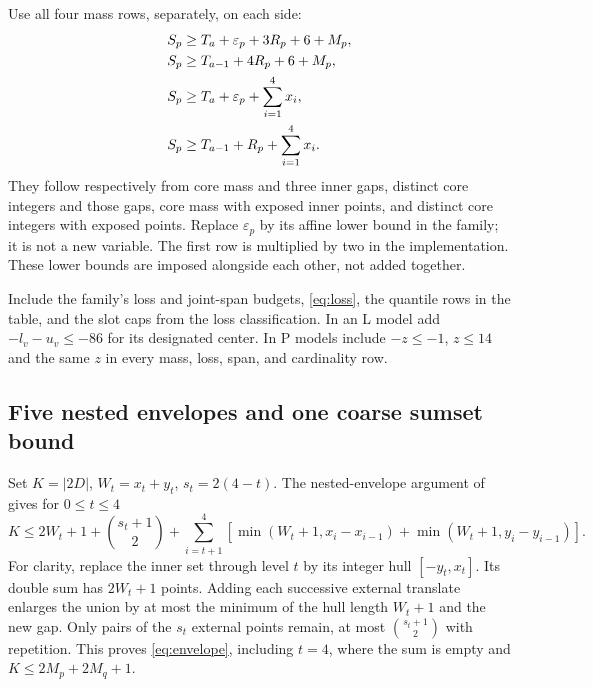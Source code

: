 \documentclass[11pt,a4paper]{article}
\begin{document}
Use all four mass rows, separately, on each side:
\begin{align}
 S_p&\ge T_a+\varepsilon_p+3R_p+6+M_p,\notag\\
 S_p&\ge T_{a-1}+4R_p+6+M_p,\notag\\
 S_p&\ge T_a+\varepsilon_p+\sum_{i=1}^4x_i,\notag\\
 S_p&\ge T_{a-1}+R_p+\sum_{i=1}^4x_i.\label{eq:mass}
\end{align}
They follow respectively from core mass and three inner gaps, distinct
core integers and those gaps, core mass with exposed inner points, and
distinct core integers with exposed points. Replace $\varepsilon_p$
by its affine lower bound in the family; it is not a new variable.
The first row is multiplied by two in the implementation.
These lower bounds are imposed alongside each other, not added together.

Include the family's loss and joint-span budgets, \eqref{eq:loss}, the
quantile rows in the table, and the slot caps from the loss classification.
In an L model add $-l_v-u_v\le-86$ for its designated center.
In P models include $-z\le-1$, $z\le14$ and the same $z$ in every
mass, loss, span, and cardinality row.

\subsection{Five nested envelopes and one coarse sumset bound}
Set $K=|2D|$, $W_t=x_t+y_t$, $s_t=2(4-t)$.
The nested-envelope argument of \cite{base98} gives for $0\le t\le4$
\begin{equation}\label{eq:envelope}
 K\le2W_t+1+\binom{s_t+1}{2}
 +\sum_{i=t+1}^4\!\left[
 \min(W_t+1,x_i-x_{i-1})+\min(W_t+1,y_i-y_{i-1})\right].
\end{equation}
For clarity, replace the inner set through level $t$ by its integer hull
$[-y_t,x_t]$. Its double sum has $2W_t+1$ points. Adding each successive
external translate enlarges the union by at most the minimum of the
hull length $W_t+1$ and the new gap. Only pairs of the $s_t$ external
points remain, at most $\binom{s_t+1}{2}$ with repetition. This proves
\eqref{eq:envelope}, including $t=4$, where the sum is empty and
$K\le2M_p+2M_q+1$.
\end{document}
